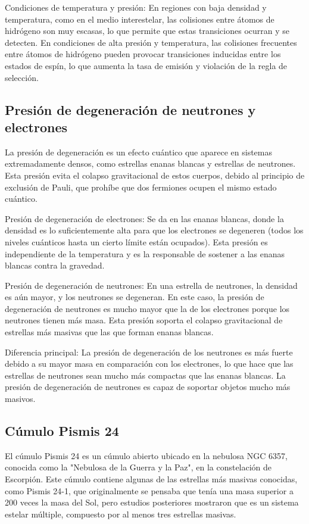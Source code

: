 \documentclass{article}
\begin{document}
Condiciones de temperatura y presión: En regiones con baja densidad y temperatura, como en el medio interestelar, las colisiones entre átomos de hidrógeno son muy escasas, lo que permite que estas transiciones ocurran y se detecten. En condiciones de alta presión y temperatura, las colisiones frecuentes entre átomos de hidrógeno pueden provocar transiciones inducidas entre los estados de espín, lo que aumenta la tasa de emisión y violación de la regla de selección.

\subsection{Presión de degeneración de neutrones y electrones}
La presión de degeneración es un efecto cuántico que aparece en sistemas extremadamente densos, como estrellas enanas blancas y estrellas de neutrones. Esta presión evita el colapso gravitacional de estos cuerpos, debido al principio de exclusión de Pauli, que prohíbe que dos fermiones ocupen el mismo estado cuántico.

Presión de degeneración de electrones: Se da en las enanas blancas, donde la densidad es lo suficientemente alta para que los electrones se degeneren (todos los niveles cuánticos hasta un cierto límite están ocupados). Esta presión es independiente de la temperatura y es la responsable de sostener a las enanas blancas contra la gravedad.

Presión de degeneración de neutrones: En una estrella de neutrones, la densidad es aún mayor, y los neutrones se degeneran. En este caso, la presión de degeneración de neutrones es mucho mayor que la de los electrones porque los neutrones tienen más masa. Esta presión soporta el colapso gravitacional de estrellas más masivas que las que forman enanas blancas.

Diferencia principal: La presión de degeneración de los neutrones es más fuerte debido a su mayor masa en comparación con los electrones, lo que hace que las estrellas de neutrones sean mucho más compactas que las enanas blancas. La presión de degeneración de neutrones es capaz de soportar objetos mucho más masivos.

\subsection{Cúmulo Pismis 24}
El cúmulo Pismis 24 es un cúmulo abierto ubicado en la nebulosa NGC 6357, conocida como la "Nebulosa de la Guerra y la Paz", en la constelación de Escorpión. Este cúmulo contiene algunas de las estrellas más masivas conocidas, como Pismis 24-1, que originalmente se pensaba que tenía una masa superior a 200 veces la masa del Sol, pero estudios posteriores mostraron que es un sistema estelar múltiple, compuesto por al menos tres estrellas masivas.
\end{document}
